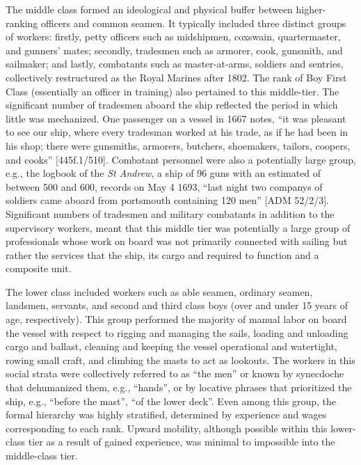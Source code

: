The middle class formed an ideological and physical buffer between higher-ranking officers and common seamen. It typically included three distinct groups of workers: firstly, petty officers such as midshipmen, coxswain, quartermaster, and gunners’ mates; secondly, tradesmen such as armorer, cook, gunsmith, and sailmaker; and lastly, combatants such as master-at-arms, soldiers and sentries, collectively restructured as the Royal Marines after 1802. The rank of Boy First Class (essentially an officer in training) also pertained to this middle-tier.  The significant number of tradesmen aboard the ship reflected the period in which little was mechanized. One passenger on a  vessel in 1667 notes, “it was pleasant to see our ship, where every tradesman worked at his trade, as if he had been in his shop; there were gunsmiths, armorers, butchers, shoemakers, tailors, coopers, and cooks” [445f.1/510]. Combatant personnel were also a potentially large group, e.g., the logbook of the \textit{St Andrew}, a ship of 96 guns with an estimated  of between 500 and 600, records on May 4 1693, “last night two companys of soldiers came aboard from portsmouth containing 120 men” [ADM 52/2/3]. Significant numbers of tradesmen and military combatants in addition to the supervisory workers, meant that this middle tier was potentially a large group of professionals whose work on board was not primarily connected with sailing but rather the services that the ship, its cargo and  required to function and a composite unit.

The lower class included workers such as able seamen, ordinary seamen, landsmen, servants, and second and third class boys (over and under 15 years of age, respectively). This group performed the majority of manual labor on board the vessel with respect to rigging and managing the sails, loading and unloading cargo and ballast, cleaning and keeping the vessel operational and watertight, rowing small craft, and climbing the masts to act as lookouts. The workers in this social strata were collectively referred to as “the men” or known by synecdoche that dehumanized them, e.g., “hands”, or by locative phrases that prioritized the ship, e.g., “before the mast”, “of the lower deck”. Even among this group, the formal hierarchy was highly stratified, determined by experience and wages corresponding to each rank. Upward mobility, although possible within this lower-class tier as a result of gained experience, was minimal to impossible into the middle-class tier. 

